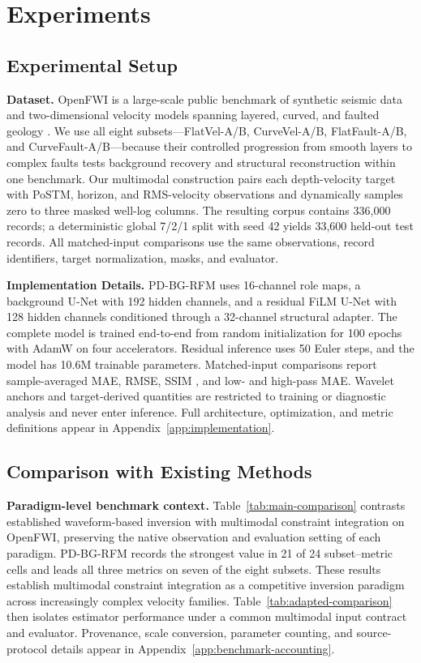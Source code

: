\section{Experiments}

\subsection{Experimental Setup}
\textbf{Dataset.} OpenFWI is a large-scale public benchmark of synthetic seismic data and two-dimensional velocity models spanning layered, curved, and faulted geology \cite{deng2022openfwi}. We use all eight subsets---FlatVel-A/B, CurveVel-A/B, FlatFault-A/B, and CurveFault-A/B---because their controlled progression from smooth layers to complex faults tests background recovery and structural reconstruction within one benchmark. Our multimodal construction pairs each depth-velocity target with PoSTM, horizon, and RMS-velocity observations and dynamically samples zero to three masked well-log columns. The resulting corpus contains 336,000 records; a deterministic global 7/2/1 split with seed 42 yields 33,600 held-out test records. All matched-input comparisons use the same observations, record identifiers, target normalization, masks, and evaluator.

\textbf{Implementation Details.} PD-BG-RFM uses 16-channel role maps, a background U-Net with 192 hidden channels, and a residual FiLM U-Net with 128 hidden channels conditioned through a 32-channel structural adapter. The complete model is trained end-to-end from random initialization for 100 epochs with AdamW \cite{loshchilov2019decoupled} on four accelerators. Residual inference uses 50 Euler steps, and the model has 10.6M trainable parameters. Matched-input comparisons report sample-averaged MAE, RMSE, SSIM \cite{wang2004ssim}, and low- and high-pass MAE. Wavelet anchors and target-derived quantities are restricted to training or diagnostic analysis and never enter inference. Full architecture, optimization, and metric definitions appear in Appendix~\ref{app:implementation}.

\subsection{Comparison with Existing Methods}
\textbf{Paradigm-level benchmark context.} Table~\ref{tab:main-comparison} contrasts established waveform-based inversion with multimodal constraint integration on OpenFWI, preserving the native observation and evaluation setting of each paradigm. PD-BG-RFM records the strongest value in 21 of 24 subset--metric cells and leads all three metrics on seven of the eight subsets. These results establish multimodal constraint integration as a competitive inversion paradigm across increasingly complex velocity families. Table~\ref{tab:adapted-comparison} then isolates estimator performance under a common multimodal input contract and evaluator. Provenance, scale conversion, parameter counting, and source-protocol details appear in Appendix~\ref{app:benchmark-accounting}.

